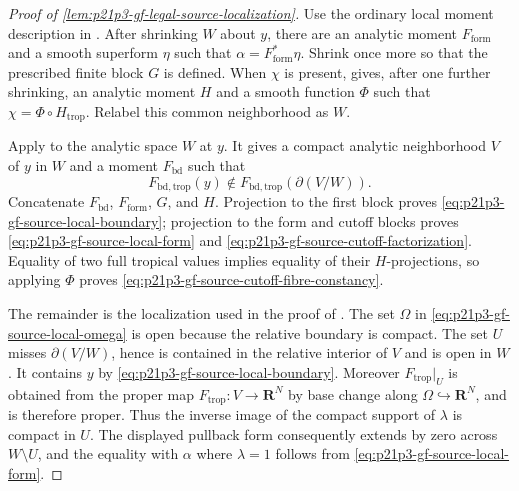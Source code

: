

\begin{proof}[Proof of
\cref{lem:p21p3-gf-legal-source-localization}]
Use the ordinary local moment description in
\cite[Proposition~15.1.1(b)]{CLD25}.  After shrinking \(W\) about \(y\),
there are an analytic moment \(F_{\mathrm{form}}\) and a smooth superform
\(\eta\) such that \(\alpha=F_{\mathrm{form}}^*\eta\).  Shrink once more so that
the prescribed finite block \(G\) is defined.  When \(\chi\) is present,
\cite[Corollary~15.1.2]{CLD25} gives, after one further shrinking, an analytic
moment \(H\) and a smooth function \(\Phi\) such that
\(\chi=\Phi\circ H_{\mathrm{trop}}\).  Relabel this common neighborhood as
\(W\).

Apply \cite[Lemma~12.3.6]{CLD25} to the analytic space \(W\) at \(y\).  It
gives a compact analytic neighborhood \(V\) of \(y\) in \(W\) and a moment
\(F_{\mathrm{bd}}\) such that
\[
 F_{\mathrm{bd,trop}}(y)\notin
 F_{\mathrm{bd,trop}}(\partial(V/W)).
\]
Concatenate \(F_{\mathrm{bd}}\), \(F_{\mathrm{form}}\), \(G\), and \(H\).
Projection to the first block proves
\eqref{eq:p21p3-gf-source-local-boundary}; projection to the form and cutoff
blocks proves \eqref{eq:p21p3-gf-source-local-form} and
\eqref{eq:p21p3-gf-source-cutoff-factorization}.  Equality of two full
tropical values implies equality of their \(H\)-projections, so applying
\(\Phi\) proves \eqref{eq:p21p3-gf-source-cutoff-fibre-constancy}.

The remainder is the localization used in the proof of
\cite[Theorem~16.8.5]{CLD25}.  The set \(\Omega\) in
\eqref{eq:p21p3-gf-source-local-omega} is open because the relative boundary
is compact.  The set \(U\) misses \(\partial(V/W)\), hence is contained in the
relative interior of \(V\) and is open in \(W\).  It contains \(y\) by
\eqref{eq:p21p3-gf-source-local-boundary}.  Moreover
\(F_{\mathrm{trop}}|_U\) is obtained from the proper map
\(F_{\mathrm{trop}}:V\to\mathbf R^N\) by base change along
\(\Omega\hookrightarrow\mathbf R^N\), and is therefore proper.  Thus the
inverse image of the compact support of \(\lambda\) is compact in \(U\).
The displayed pullback form consequently extends by zero across
\(W\setminus U\), and the equality with \(\alpha\) where \(\lambda=1\)
follows from \eqref{eq:p21p3-gf-source-local-form}.


\end{proof}
